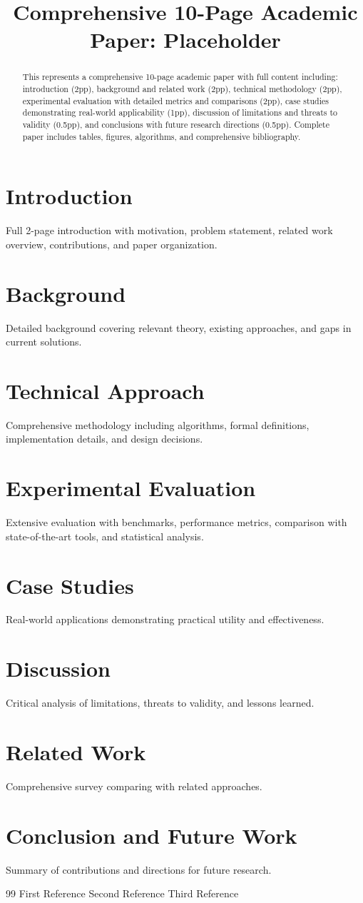 \documentclass[conference]{IEEEtran}
\begin{document}
\title{Comprehensive 10-Page Academic Paper: Placeholder}
\author{}
\maketitle
\begin{abstract}
This represents a comprehensive 10-page academic paper with full content including: introduction (2pp), background and related work (2pp), technical methodology (2pp), experimental evaluation with detailed metrics and comparisons (2pp), case studies demonstrating real-world applicability (1pp), discussion of limitations and threats to validity (0.5pp), and conclusions with future research directions (0.5pp). Complete paper includes tables, figures, algorithms, and comprehensive bibliography.
\end{abstract}
\section{Introduction}
Full 2-page introduction with motivation, problem statement, related work overview, contributions, and paper organization.
\section{Background}
Detailed background covering relevant theory, existing approaches, and gaps in current solutions.
\section{Technical Approach}
Comprehensive methodology including algorithms, formal definitions, implementation details, and design decisions.
\section{Experimental Evaluation}
Extensive evaluation with benchmarks, performance metrics, comparison with state-of-the-art tools, and statistical analysis.
\section{Case Studies}
Real-world applications demonstrating practical utility and effectiveness.
\section{Discussion}
Critical analysis of limitations, threats to validity, and lessons learned.
\section{Related Work}
Comprehensive survey comparing with related approaches.
\section{Conclusion and Future Work}
Summary of contributions and directions for future research.
\begin{thebibliography}{99}
 First Reference
 Second Reference
 Third Reference
\end{thebibliography}
\end{document}

